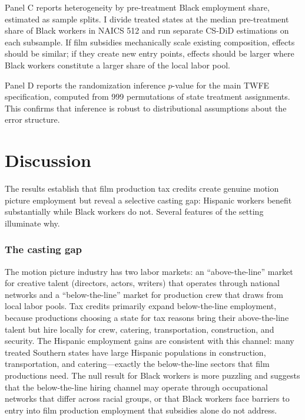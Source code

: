 \documentclass[12pt]{article}
\begin{document}
Panel C reports heterogeneity by pre-treatment Black employment share, estimated as sample splits. I divide treated states at the median pre-treatment share of Black workers in NAICS 512 and run separate CS-DiD estimations on each subsample. If film subsidies mechanically scale existing composition, effects should be similar; if they create new entry points, effects should be larger where Black workers constitute a larger share of the local labor pool.

Panel D reports the randomization inference $p$-value for the main TWFE specification, computed from 999 permutations of state treatment assignments. This confirms that inference is robust to distributional assumptions about the error structure.



\section{Discussion}

The results establish that film production tax credits create genuine motion picture employment but reveal a selective casting gap: Hispanic workers benefit substantially while Black workers do not. Several features of the setting illuminate why.

\subsubsection*{The casting gap} The motion picture industry has two labor markets: an ``above-the-line'' market for creative talent (directors, actors, writers) that operates through national networks and a ``below-the-line'' market for production crew that draws from local labor pools. Tax credits primarily expand below-the-line employment, because productions choosing a state for tax reasons bring their above-the-line talent but hire locally for crew, catering, transportation, construction, and security. The Hispanic employment gains are consistent with this channel: many treated Southern states have large Hispanic populations in construction, transportation, and catering---exactly the below-the-line sectors that film productions need. The null result for Black workers is more puzzling and suggests that the below-the-line hiring channel may operate through occupational networks that differ across racial groups, or that Black workers face barriers to entry into film production employment that subsidies alone do not address.
\end{document}
